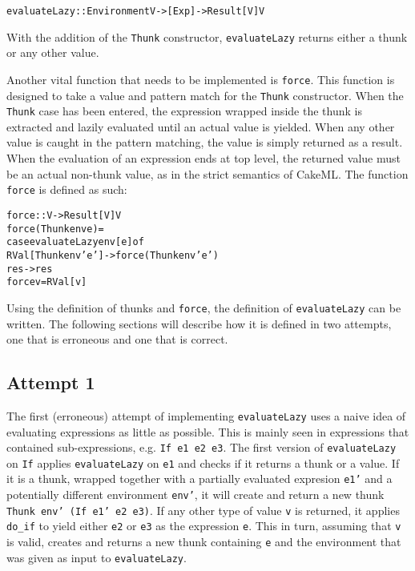 \begin{alltt}
  evaluateLazy :: Environment V -> [Exp] -> Result [V] V
\end{alltt}

\noindent With the addition of the \texttt{Thunk} constructor, \texttt{evaluateLazy}
returns either a thunk or any other value.

Another vital function that needs to be implemented is \texttt{force}.
This function is designed to take a value and pattern match for the
\texttt{Thunk} constructor. When the \texttt{Thunk} case has been entered,
the expression wrapped inside the thunk is extracted and lazily evaluated until
an actual value is yielded. When any other value is caught in the pattern matching,
the value is simply returned as a result.
When the evaluation of an expression ends at top level, the returned value
must be an actual non-thunk value, as in the strict semantics of CakeML.
The function \texttt{force} is defined as such:

\begin{alltt}
  force :: V -> Result [V] V
  force (Thunk env e) =
    case evaluateLazy env [e] of
      RVal [Thunk env' e'] -> force (Thunk env' e')
      res -> res
  force v = RVal [v]
\end{alltt}

Using the definition of thunks and \texttt{force}, the definition of
\texttt{evaluateLazy} can be written.
The following sections will describe how it is defined in two attempts,
one that is erroneous and one that is correct.

\subsection{Attempt 1}
The first (erroneous) attempt of implementing \texttt{evaluateLazy} uses a naive
idea of evaluating expressions as little as possible. This is mainly seen in
expressions that contained sub-expressions, e.g. \texttt{If e1 e2 e3}. The first
version of \texttt{evaluateLazy} on \texttt{If} applies
\texttt{evaluateLazy} on \texttt{e1} and checks if it returns a thunk or a
value. If it is a thunk, wrapped together with a partially evaluated expresion
\texttt{e1'} and a potentially different environment \texttt{env'}, it will
create and return a new thunk \texttt{Thunk env' (If e1' e2 e3)}. If any other
type of value \texttt{v} is returned, it applies \texttt{do\_if} to yield either
\texttt{e2} or \texttt{e3} as the expression \texttt{e}. This in turn,
assuming that \texttt{v} is valid, creates and returns a new thunk containing
\texttt{e} and the environment that was given as input to \texttt{evaluateLazy}.

